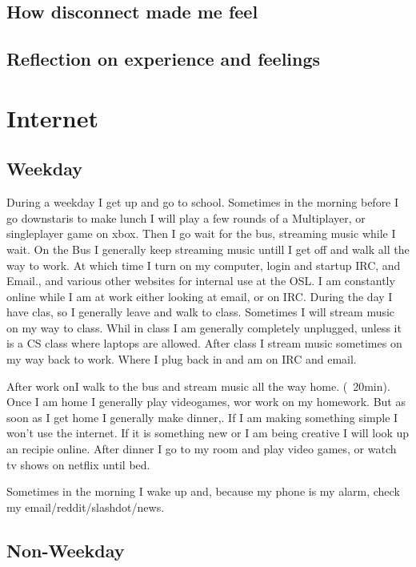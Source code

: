 \documentclass[12pt,letterpaper]{article}
\begin{document}
\subsection{How disconnect made me feel}
\subsection{Reflection on experience and feelings}


\section{Internet}
\subsection{Weekday}
During a weekday I get up and go to school. Sometimes in the morning
before I go downstaris to make lunch I will play a few rounds of a
Multiplayer, or singleplayer game on xbox. Then I go wait for the bus,
streaming music while I wait. On the Bus I generally keep streaming
music untill I get off and walk all the way to work. At which time I
turn on my computer, login and startup IRC, and Email., and various
other websites for internal use at the OSL. I am constantly online while
I am at work either looking at email, or on IRC. During the day I have
clas, so I generally leave and walk to class. Sometimes I will stream
music on my way to class. Whil in class I am generally completely
unplugged, unless it is a CS class where laptops are allowed.  After
class I stream music sometimes on my way back to work.  Where I plug
back in and am on IRC and email.

After work onI walk to the bus and stream music all the way home.
(~20min). Once I am home I generally play videogames, wor work on my
homework. But as soon as I get home I generally make dinner,. If I am
making something simple I won't use the internet. If it is something new
or I am being creative I will look up an recipie online. After dinner I
go to my room and play video games, or watch tv shows on netflix until
bed.

Sometimes in the morning I wake up and, because my phone is my alarm,
check my email/reddit/slashdot/news.


\subsection{Non-Weekday}
\end{document}
